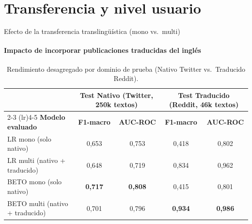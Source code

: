 
\section{Transferencia y nivel usuario}

\begin{frame}{Efecto de la transferencia translingüística (mono vs.\ multi)}
  \framesubtitle{Impacto de incorporar publicaciones traducidas del inglés}

  \begin{table}
    \centering\scriptsize
    \setlength{\tabcolsep}{5pt}
    \caption{Rendimiento desagregado por dominio de prueba (Nativo Twitter vs.\ Traducido Reddit).}
    \begin{tabular}{lcccc}
      \toprule
      & \multicolumn{2}{c}{\textbf{Test Nativo (Twitter, 250k textos)}} & \multicolumn{2}{c}{\textbf{Test Traducido (Reddit, 46k textos)}} \\
      \cmidrule(lr){2-3} \cmidrule(lr){4-5}
      \textbf{Modelo evaluado} & \textbf{F1-macro} & \textbf{AUC-ROC} & \textbf{F1-macro} & \textbf{AUC-ROC} \\
      \midrule
      LR mono (solo nativo) & 0{,}653 & 0{,}753 & 0{,}418 & 0{,}802 \\
      LR multi (nativo + traducido) & 0{,}648 & 0{,}719 & 0{,}834 & 0{,}962 \\
      \midrule
      BETO mono (solo nativo) & \textbf{0{,}717} & \textbf{0{,}808} & 0{,}415 & 0{,}801 \\
      BETO multi (nativo + traducido) & 0{,}701 & 0{,}796 & \textbf{0{,}934} & \textbf{0{,}986} \\
      \bottomrule
    \end{tabular}
  \end{table}

  \vskip-0.15cm
  \begin{columns}[T]
  \end{columns}


\end{frame}
